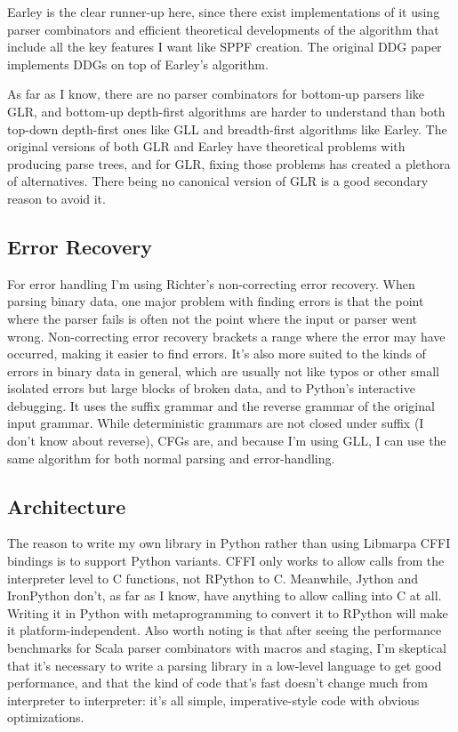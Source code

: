 \documentclass[12pt]{article}
\begin{document}
Earley is the clear runner-up here, since there exist implementations
of it using parser combinators and efficient theoretical developments
of the algorithm that include all the key features I want like SPPF
creation.  The original DDG paper \textcite{yakker1} implements DDGs
on top of Earley's algorithm.

As far as I know, there are no parser combinators for bottom-up
parsers like GLR, and bottom-up depth-first algorithms are harder to
understand than both top-down depth-first ones like GLL and
breadth-first algorithms like Earley.  The original versions of both
GLR and Earley have theoretical problems with producing parse trees,
and for GLR, fixing those problems has created a plethora of
alternatives.  There being no canonical version of GLR is a good
secondary reason to avoid it.


\subsection{Error Recovery}
\label{sec:errors}

For error handling I'm using Richter's non-correcting error recovery.
When parsing binary data, one major problem with finding errors is
that the point where the parser fails is often not the point where the
input or parser went wrong.  Non-correcting error recovery brackets a
range where the error may have occurred, making it easier to find
errors.  It's also more suited to the kinds of errors in binary data
in general, which are usually not like typos or other small isolated
errors but large blocks of broken data, and to Python's interactive
debugging.  It uses the suffix grammar and the reverse grammar of the
original input grammar.  While deterministic grammars are not closed
under suffix (I don't know about reverse), CFGs are, and because I'm
using GLL, I can use the same algorithm for both normal parsing and
error-handling.


\subsection{Architecture}
\label{sec:architecture}

The reason to write my own library in Python rather than using
Libmarpa CFFI bindings is to support Python variants.  CFFI only works
to allow calls from the interpreter level to C functions, not RPython
to C.  Meanwhile, Jython and IronPython don't, as far as I know, have
anything to allow calling into C at all.  Writing it in Python with
metaprogramming to convert it to RPython will make it
platform-independent. Also worth noting is that after seeing the
performance benchmarks for Scala parser combinators with macros and
staging, I'm skeptical that it's necessary to write a parsing library
in a low-level language to get good performance, and that the kind of
code that's fast doesn't change much from interpreter to interpreter:
it's all simple, imperative-style code with obvious optimizations.
\end{document}

